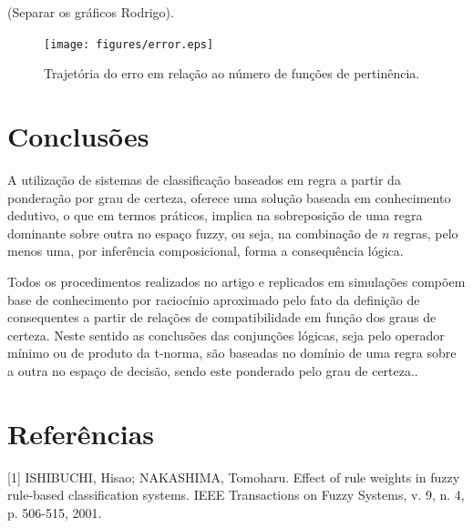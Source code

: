 \documentclass[12pt,a4paper]{article}
\numberwithin{equation}{section}
\begin{document}
(Separar os gráficos Rodrigo).

\begin{figure}[ht]
\centering
\texttt{[image: figures/error.eps]}
\caption{Trajetória do erro em relação ao número de funções de pertinência.}
\label{fig:error}
\end{figure}

\newpage
\section{Conclusões}

A utilização de sistemas de classificação baseados em regra a partir da ponderação por grau de certeza, oferece uma solução baseada em conhecimento dedutivo, o que em termos práticos, implica na sobreposição de uma regra dominante sobre outra no espaço fuzzy, ou seja, na combinação de $n$ regras, pelo menos uma, por inferência composicional, forma a consequência lógica.

Todos os procedimentos realizados no artigo e replicados em simulações compõem base de conhecimento por raciocínio aproximado pelo fato da definição de consequentes a partir de relações de compatibilidade em função dos graus de certeza. Neste sentido as conclusões das conjunções lógicas, seja pelo operador mínimo ou de produto da t-norma, são baseadas no domínio de uma regra sobre a outra no espaço de decisão, sendo este ponderado pelo grau de certeza..
\newpage

\section*{Referências}
%

[1] ISHIBUCHI, Hisao; NAKASHIMA, Tomoharu. Effect of rule weights in fuzzy rule-based classification systems. IEEE Transactions on Fuzzy Systems, v. 9, n. 4, p. 506-515, 2001.
\end{document}
